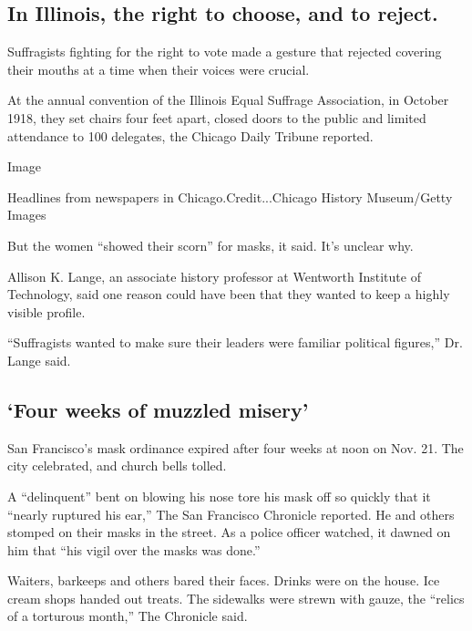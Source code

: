 \hypertarget{in-illinois-the-right-to-choose-and-to-reject}{%
\subsection{In Illinois, the right to choose, and to
reject.}\label{in-illinois-the-right-to-choose-and-to-reject}}

Suffragists fighting for the right to vote made a gesture that rejected
covering their mouths at a time when their voices were crucial.

At the annual convention of the Illinois Equal Suffrage Association, in
October 1918, they set chairs four feet apart, closed doors to the
public and limited attendance to 100 delegates, the Chicago Daily
Tribune reported.

Image

Headlines from newspapers in Chicago.Credit...Chicago History
Museum/Getty Images

But the women ``showed their scorn'' for masks, it said. It's unclear
why.

Allison K. Lange, an associate history professor at Wentworth Institute
of Technology, said one reason could have been that they wanted to keep
a highly visible profile.

``Suffragists wanted to make sure their leaders were familiar political
figures,'' Dr. Lange said.

\hypertarget{four-weeks-of-muzzled-misery}{%
\subsection{`Four weeks of muzzled
misery'}\label{four-weeks-of-muzzled-misery}}

San Francisco's mask ordinance expired after four weeks at noon on Nov.
21. The city celebrated, and church bells tolled.

A ``delinquent'' bent on blowing his nose tore his mask off so quickly
that it ``nearly ruptured his ear,'' The San Francisco Chronicle
reported. He and others stomped on their masks in the street. As a
police officer watched, it dawned on him that ``his vigil over the masks
was done.''

Waiters, barkeeps and others bared their faces. Drinks were on the
house. Ice cream shops handed out treats. The sidewalks were strewn with
gauze, the ``relics of a torturous month,'' The Chronicle said.

\href{https://www.nytimes.com/news-event/coronavirus?action=click\&pgtype=Article\&state=default\&region=MAIN_CONTENT_3\&context=storylines_faq}{}

